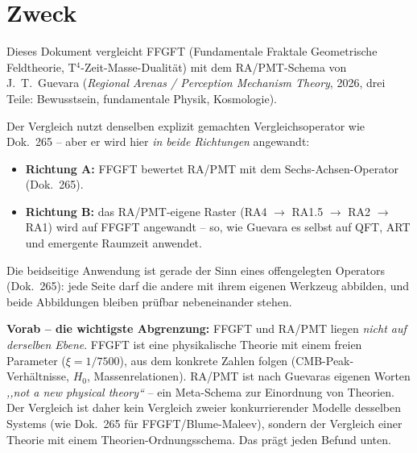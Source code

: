 %
%

\section*{Zweck}

Dieses Dokument vergleicht FFGFT (Fundamentale Fraktale Geometrische
Feldtheorie, T$^4$-Zeit-Masse-Dualität) mit dem RA/PMT-Schema von
J.~T.~Guevara (\emph{Regional Arenas / Perception Mechanism Theory},
2026, drei Teile: Bewusstsein, fundamentale Physik, Kosmologie).

Der Vergleich nutzt denselben explizit gemachten Vergleichsoperator wie
Dok.~265 -- aber er wird hier \emph{in beide Richtungen} angewandt:

\begin{itemize}
  \item \textbf{Richtung A:} FFGFT bewertet RA/PMT mit dem
        Sechs-Achsen-Operator (Dok.~265).
  \item \textbf{Richtung B:} das RA/PMT-eigene Raster
        (RA4 $\to$ RA1.5 $\to$ RA2 $\to$ RA1) wird auf FFGFT angewandt --
        so, wie Guevara es selbst auf QFT, ART und emergente Raumzeit
        anwendet.
\end{itemize}

Die beidseitige Anwendung ist gerade der Sinn eines offengelegten
Operators (Dok.~265): jede Seite darf die andere mit ihrem eigenen
Werkzeug abbilden, und beide Abbildungen bleiben prüfbar nebeneinander
stehen.

\textbf{Vorab -- die wichtigste Abgrenzung:} FFGFT und RA/PMT liegen
\emph{nicht auf derselben Ebene}. FFGFT ist eine physikalische Theorie
mit einem freien Parameter ($\xi = 1/7500$), aus dem konkrete Zahlen
folgen (CMB-Peak-Verhältnisse, $H_0$, Massenrelationen). RA/PMT ist
nach Guevaras eigenen Worten \emph{,,not a new physical theory``} --
ein Meta-Schema zur Einordnung von Theorien. Der Vergleich ist daher
kein Vergleich zweier konkurrierender Modelle desselben Systems
(wie Dok.~265 für FFGFT/Blume-Maleev), sondern der Vergleich einer
Theorie mit einem Theorien-Ordnungsschema. Das prägt jeden Befund unten.

